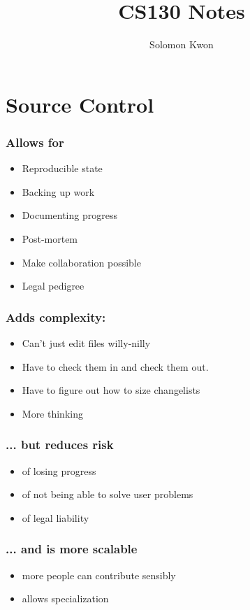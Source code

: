 \documentclass{article}
\title{CS130 Notes}
\author{Solomon Kwon}
\begin{document}
\maketitle

\pagebreak

\section{Source Control}

\subsubsection*{Allows for}
\begin{itemize}
    \item Reproducible state
    \item Backing up work
    \item Documenting progress
    \item Post-mortem
    \item Make collaboration possible
    \item Legal pedigree
\end{itemize}

\vspace*{1em}

\subsubsection*{Adds complexity:}

\begin{itemize}
    \item Can't just edit files willy-nilly
    \item Have to check them in and check them out.
    \item Have to figure out how to size changelists
    \item More thinking
\end{itemize}
\begin{multicols}{2}
    \subsubsection*{... but reduces risk}
        \begin{itemize}
            \item of losing progress
            \item of not being able to solve user problems
            \item of legal liability
        \end{itemize}
    \subsubsection*{... and is more scalable}
        \begin{itemize}
            \item more people can contribute sensibly
            \item allows specialization
        \end{itemize}
\end{multicols}
\end{document}

